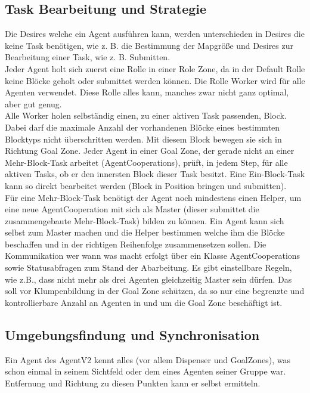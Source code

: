 \documentclass[runningheads]{llncs}
\begin{document}
\subsection{Task Bearbeitung und Strategie}
Die Desires welche ein Agent ausführen kann, werden unterschieden in Desires die keine Task benötigen, wie z. B. die Bestimmung der Mapgröße und Desires zur Bearbeitung einer Task, wie z. B. Submitten.\\

Jeder Agent holt sich zuerst eine Rolle in einer Role Zone, da in der Default Rolle keine Blöcke geholt oder submittet werden können. Die Rolle Worker wird für alle Agenten verwendet. Diese Rolle alles kann, manches zwar nicht ganz optimal, aber gut genug.\\

Alle Worker holen selbständig einen, zu einer aktiven Task passenden, Block. Dabei darf die maximale Anzahl der vorhandenen Blöcke eines bestimmten Blocktyps nicht überschritten werden. Mit diesem Block bewegen sie sich in Richtung Goal Zone. 
Jeder Agent in einer Goal Zone, der gerade nicht an einer Mehr-Block-Task arbeitet (AgentCooperations), prüft, in jedem Step, für alle aktiven Tasks, ob er den innersten Block dieser Task besitzt. Eine Ein-Block-Task kann so direkt bearbeitet werden (Block in Position bringen und submitten). \\

Für eine Mehr-Block-Task benötigt der Agent noch mindestens einen Helper, um eine neue AgentCooperation mit sich als Master (dieser submittet die zusammengebaute Mehr-Block-Task) bilden zu können. 
Ein Agent kann sich selbst zum Master machen und die Helper bestimmen welche ihm die Blöcke beschaffen und in der richtigen Reihenfolge zusammensetzen sollen.  
Die Kommunikation wer wann was macht erfolgt über ein Klasse AgentCooperations sowie Statusabfragen zum Stand der Abarbeitung. Es gibt einstellbare Regeln, wie z.B., dass nicht mehr als drei Agenten gleichzeitig Master sein dürfen. Das soll vor Klumpenbildung in der Goal Zone schützen, da so nur eine begrenzte und kontrollierbare Anzahl an Agenten in und um die Goal Zone beschäftigt ist.\\

\subsection{Umgebungsfindung und Synchronisation}
Ein Agent des AgentV2 kennt alles (vor allem Dispenser und GoalZones), was schon einmal in seinem Sichtfeld oder dem eines Agenten seiner Gruppe war. Entfernung und Richtung zu diesen Punkten kann er selbst ermitteln.\\
\end{document}
